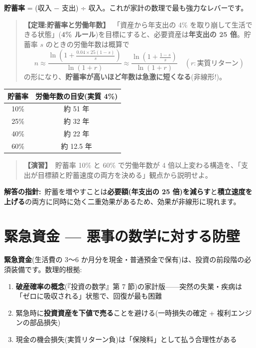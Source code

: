\documentclass{article}
\begin{document}
\textbf{貯蓄率} = (収入 − 支出) ÷ 収入。これが家計の数理で最も強力なレバーです。

\begin{quote}
\textbf{【定理:貯蓄率と労働年数】}\ 「資産から年支出の 4\% を取り崩して生活できる状態」(\textbf{4\% ルール})を目標にすると、必要資産は\textbf{年支出の 25 倍}。貯蓄率 \(s\) のときの労働年数は概算で
\[ n \approx \frac{\ln\left(1 + \frac{0.04 \times 25(1-s)}{s}\right)}{\ln(1 + r)} \approx \frac{\ln\left(1 + \frac{1-s}{s}\right)}{\ln(1+r)} \quad (r: \text{実質リターン}) \]
の形になり、\textbf{貯蓄率が高いほど年数は急激に短くなる}(非線形!)。
\end{quote}

\begin{center}
\begin{tabular}{|c|c|}
\hline
貯蓄率 & 労働年数の目安(実質 4\%) \\
\hline
10\% & 約 51 年 \\
25\% & 約 32 年 \\
40\% & 約 22 年 \\
60\% & 約 12.5 年 \\
\hline
\end{tabular}
\end{center}

\begin{quote}
\textbf{【演習】}\ 貯蓄率 10\% と 60\% で労働年数が 4 倍以上変わる構造を、「支出が目標額と貯蓄速度の両方を決める」観点から説明せよ。
\end{quote}

\textbf{解答の指針:}\ 貯蓄を増やすことは\textbf{必要額(年支出の 25 倍)を減らす}と\textbf{積立速度を上げる}の両方に同時に効く二重効果があるため、効果が非線形に現れます。

\section{緊急資金 — 悪事の数学に対する防壁}

\textbf{緊急資金}(生活費の 3〜6 か月分を現金・普通預金で保有)は、投資の前段階の必須装備です。数理的根拠:

\begin{enumerate}
\item \textbf{破産確率の概念}(『投資の数学』第 7 節)の家計版——突然の失業・疾病は「ゼロに吸収される」状態で、回復が最も困難
\item 緊急時に\textbf{投資資産を下値で売る}ことを避ける(一時損失の確定 + 複利エンジンの部品損失)
\item 現金の機会損失(実質リターン負)は「保険料」として払う合理性がある
\end{enumerate}
\end{document}
